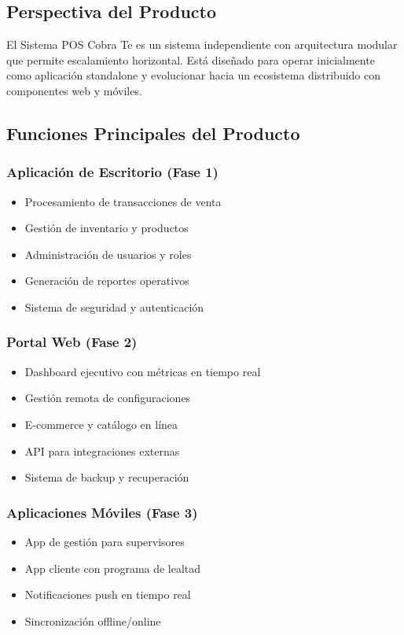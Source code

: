 \documentclass[12pt,letterpaper]{article}
\begin{document}
\subsection{Perspectiva del Producto}
El Sistema POS Cobra Te es un sistema independiente con arquitectura modular que permite escalamiento horizontal. Está diseñado para operar inicialmente como aplicación standalone y evolucionar hacia un ecosistema distribuido con componentes web y móviles.

\subsection{Funciones Principales del Producto}

\subsubsection{Aplicación de Escritorio (Fase 1)}
\begin{itemize}
    \item Procesamiento de transacciones de venta
    \item Gestión de inventario y productos
    \item Administración de usuarios y roles
    \item Generación de reportes operativos
    \item Sistema de seguridad y autenticación
\end{itemize}

\subsubsection{Portal Web (Fase 2)}
\begin{itemize}
    \item Dashboard ejecutivo con métricas en tiempo real
    \item Gestión remota de configuraciones
    \item E-commerce y catálogo en línea
    \item API para integraciones externas
    \item Sistema de backup y recuperación
\end{itemize}

\subsubsection{Aplicaciones Móviles (Fase 3)}
\begin{itemize}
    \item App de gestión para supervisores
    \item App cliente con programa de lealtad
    \item Notificaciones push en tiempo real
    \item Sincronización offline/online
\end{itemize}
\end{document}
